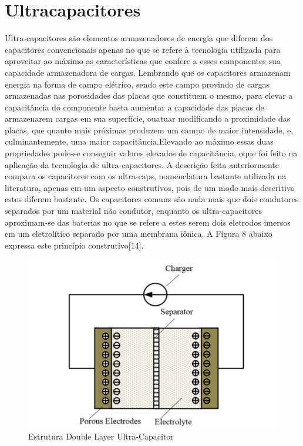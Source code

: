 \documentclass[11pt, a4paper, oneside]{article}
\begin{document}
\section{Ultracapacitores}
Ultra-capacitores são elementos armazenadores de energia que diferem dos
capacitores convencionais apenas no que se refere à tecnologia utilizada para
aproveitar ao máximo as características que confere a esses componentes sua
capacidade armazenadora de cargas. Lembrando que os capacitores armazenam
energia na forma de campo elétrico, sendo este campo provindo de cargas
armazenadas nas porosidades das placas que constituem o mesmo, para elevar a
capacitância do componente basta aumentar a capacidade das placas de
armazenarem cargas em sua superfície, ouatuar modificando a proximidade das
placas, que quanto mais próximas produzem um campo de maior intensidade, e,
culminantemente, uma maior capacitância.Elevando ao máximo essas duas
propriedades pode-se conseguir valores elevados de capacitância, oque foi feito na
aplicação da tecnologia de ultra-capacitores.
A descrição feita anteriormente compara os capacitores com os ultra-caps,
nomenclatura bastante utilizada na literatura, apenas em um aspecto construtivos,
pois de um modo mais descritivo estes diferem bastante. Os capacitores comuns
são nada mais que dois condutores separados por um material não condutor,
enquanto os ultra-capacitores aproximam-se das baterias no que se refere a estes
serem dois eletrodos imersos em um eletrolítico separado por uma membrana
iônica. A Figura 8 abaixo expressa este princípio construtivo[14].

\begin{figure}[h!]
\centering
\includegraphics[width=1\linewidth]{Ultracapacitor_interno_construcao}
\caption{Estrutura Double Layer Ultra-Capacitor \cite{ultracapacitor_interno}}
\label{fig:estrutura_equalizador_passivo_ apacitor}
\end{figure}
\end{document}
